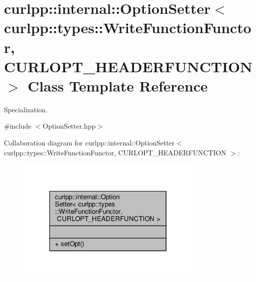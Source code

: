 \hypertarget{classcurlpp_1_1internal_1_1OptionSetter_3_01curlpp_1_1types_1_1WriteFunctionFunctor_00_01CURLOPT__HEADERFUNCTION_01_4}{\section{curlpp\-:\-:internal\-:\-:Option\-Setter$<$ curlpp\-:\-:types\-:\-:Write\-Function\-Functor, C\-U\-R\-L\-O\-P\-T\-\_\-\-H\-E\-A\-D\-E\-R\-F\-U\-N\-C\-T\-I\-O\-N $>$ Class Template Reference}
\label{classcurlpp_1_1internal_1_1OptionSetter_3_01curlpp_1_1types_1_1WriteFunctionFunctor_00_01CURLOPT__HEADERFUNCTION_01_4}
}


Specialization.  




{\ttfamily \#include $<$Option\-Setter.\-hpp$>$}



Collaboration diagram for curlpp\-:\-:internal\-:\-:Option\-Setter$<$ curlpp\-:\-:types\-:\-:Write\-Function\-Functor, C\-U\-R\-L\-O\-P\-T\-\_\-\-H\-E\-A\-D\-E\-R\-F\-U\-N\-C\-T\-I\-O\-N $>$\-:\nopagebreak
\begin{figure}[H]
\begin{center}
\leavevmode
\includegraphics[width=256pt]{classcurlpp_1_1internal_1_1OptionSetter_3_01curlpp_1_1types_1_1WriteFunctionFunctor_00_01CURLOPT26dd90c768e791a15105458418f9e1e7}
\end{center}
\end{figure}
